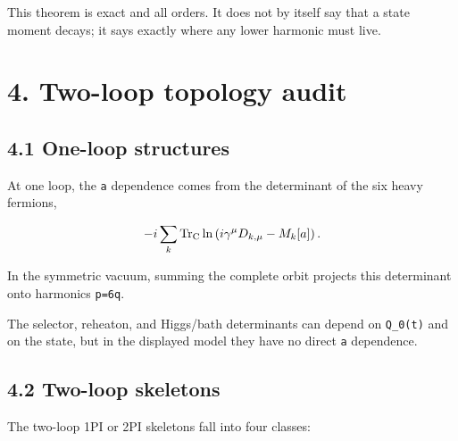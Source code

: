 \documentclass[
  10pt,
  a4paper,
]{article}
\begin{document}
This theorem is exact and all orders. It does not by itself say that a
state moment decays; it says exactly where any lower harmonic must live.

\section{4. Two-loop topology audit}\label{two-loop-topology-audit}

\subsection{4.1 One-loop structures}\label{one-loop-structures}

At one loop, the \texttt{a} dependence comes from the determinant of the
six heavy fermions,

\[
-i\sum_k{\rm Tr}_{\rm C}\ln
\left(i\gamma^\mu D_{k,\mu}-M_k[a]\right).
\]

In the symmetric vacuum, summing the complete orbit projects this
determinant onto harmonics \texttt{p=6q}.

The selector, reheaton, and Higgs/bath determinants can depend on
\texttt{Q\_0(t)} and on the state, but in the displayed model they have
no direct \texttt{a} dependence.

\subsection{4.2 Two-loop skeletons}\label{two-loop-skeletons}

The two-loop 1PI or 2PI skeletons fall into four classes:
\end{document}
